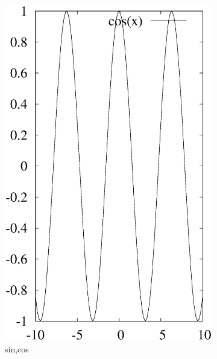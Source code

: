 \documentclass[letterpaper,showpacs,prb,preprint]{revtex4}
\begin{document}
\begin{figure}[ht]
\begin{subfigure}{0.3\textwidth}
\includegraphics [width=\textwidth]{cos.eps}
\caption{sin,cos}
\end{subfigure}
\begin{subfigure}{0.3\textwidth}

\end{subfigure}
\end{figure}
\end{document}
